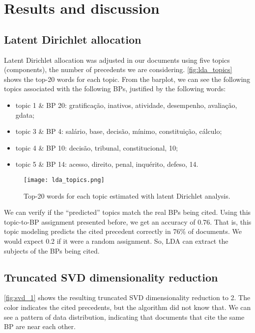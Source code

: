 \section{Results and discussion}
    \label{sec:results}

    \subsection{Latent Dirichlet allocation}

        Latent Dirichlet allocation was adjusted in our documents using five topics (components), the number of precedents we are considering. \autoref{fig:lda_topics} shows the top-20 words for each topic. From the barplot, we can see the following topics associated with the following BPs, justified by the following words:
        \begin{itemize}
                \item topic 1 \& BP 20: gratificação, inativos, atividade, desempenho, avaliação, gdata;
                \item topic 3 \& BP 4: salário, base, decisão, mínimo, constituição, cálculo;
                \item topic 4 \& BP 10: decisão, tribunal, constitucional, 10;
                \item topic 5 \& BP 14: acesso, direito, penal, inquérito, defeso, 14.
        \end{itemize}

        \begin{figure*}[!h]
                \texttt{[image: lda\_topics.png]}
                \caption{Top-20 words for each topic estimated with latent Dirichlet analysis.}
                \label{fig:lda_topics}
        \end{figure*}

        We can verify if the ``predicted'' topics match the real BPs being cited. Using this topic-to-BP assignment presented before, we get an accuracy of 0.76. That is, this topic modeling predicts the cited precedent correctly in 76\% of documents. We would expect 0.2 if it were a random assignment. So, LDA can extract the subjects of the BPs being cited.

    \subsection{Truncated SVD dimensionality reduction}

        \autoref{fig:svd_1} shows the resulting truncated SVD dimensionality reduction to 2. The color indicates the cited precedents, but the algorithm did not know that. We can see a pattern of data distribution, indicating that documents that cite the same BP are near each other.

